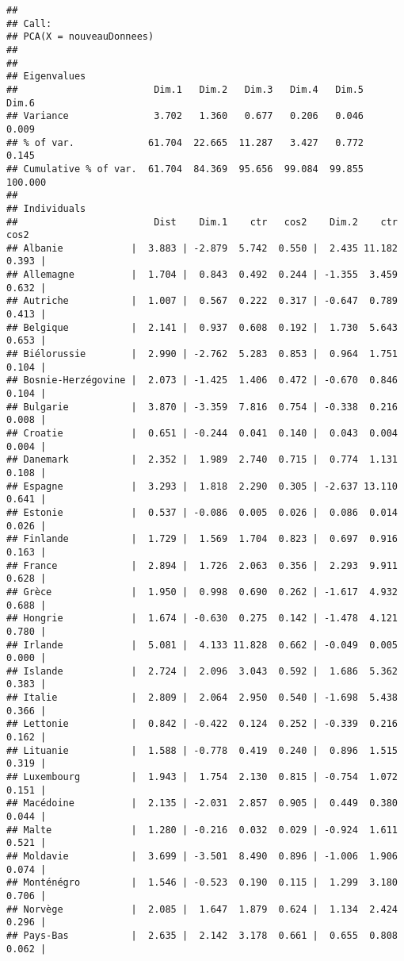 \documentclass[
]{article}
\begin{document}
\begin{verbatim}
## 
## Call:
## PCA(X = nouveauDonnees) 
## 
## 
## Eigenvalues
##                        Dim.1   Dim.2   Dim.3   Dim.4   Dim.5   Dim.6
## Variance               3.702   1.360   0.677   0.206   0.046   0.009
## % of var.             61.704  22.665  11.287   3.427   0.772   0.145
## Cumulative % of var.  61.704  84.369  95.656  99.084  99.855 100.000
## 
## Individuals
##                        Dist    Dim.1    ctr   cos2    Dim.2    ctr   cos2  
## Albanie            |  3.883 | -2.879  5.742  0.550 |  2.435 11.182  0.393 |
## Allemagne          |  1.704 |  0.843  0.492  0.244 | -1.355  3.459  0.632 |
## Autriche           |  1.007 |  0.567  0.222  0.317 | -0.647  0.789  0.413 |
## Belgique           |  2.141 |  0.937  0.608  0.192 |  1.730  5.643  0.653 |
## Biélorussie        |  2.990 | -2.762  5.283  0.853 |  0.964  1.751  0.104 |
## Bosnie-Herzégovine |  2.073 | -1.425  1.406  0.472 | -0.670  0.846  0.104 |
## Bulgarie           |  3.870 | -3.359  7.816  0.754 | -0.338  0.216  0.008 |
## Croatie            |  0.651 | -0.244  0.041  0.140 |  0.043  0.004  0.004 |
## Danemark           |  2.352 |  1.989  2.740  0.715 |  0.774  1.131  0.108 |
## Espagne            |  3.293 |  1.818  2.290  0.305 | -2.637 13.110  0.641 |
## Estonie            |  0.537 | -0.086  0.005  0.026 |  0.086  0.014  0.026 |
## Finlande           |  1.729 |  1.569  1.704  0.823 |  0.697  0.916  0.163 |
## France             |  2.894 |  1.726  2.063  0.356 |  2.293  9.911  0.628 |
## Grèce              |  1.950 |  0.998  0.690  0.262 | -1.617  4.932  0.688 |
## Hongrie            |  1.674 | -0.630  0.275  0.142 | -1.478  4.121  0.780 |
## Irlande            |  5.081 |  4.133 11.828  0.662 | -0.049  0.005  0.000 |
## Islande            |  2.724 |  2.096  3.043  0.592 |  1.686  5.362  0.383 |
## Italie             |  2.809 |  2.064  2.950  0.540 | -1.698  5.438  0.366 |
## Lettonie           |  0.842 | -0.422  0.124  0.252 | -0.339  0.216  0.162 |
## Lituanie           |  1.588 | -0.778  0.419  0.240 |  0.896  1.515  0.319 |
## Luxembourg         |  1.943 |  1.754  2.130  0.815 | -0.754  1.072  0.151 |
## Macédoine          |  2.135 | -2.031  2.857  0.905 |  0.449  0.380  0.044 |
## Malte              |  1.280 | -0.216  0.032  0.029 | -0.924  1.611  0.521 |
## Moldavie           |  3.699 | -3.501  8.490  0.896 | -1.006  1.906  0.074 |
## Monténégro         |  1.546 | -0.523  0.190  0.115 |  1.299  3.180  0.706 |
## Norvège            |  2.085 |  1.647  1.879  0.624 |  1.134  2.424  0.296 |
## Pays-Bas           |  2.635 |  2.142  3.178  0.661 |  0.655  0.808  0.062 |

\end{verbatim}
\end{document}
